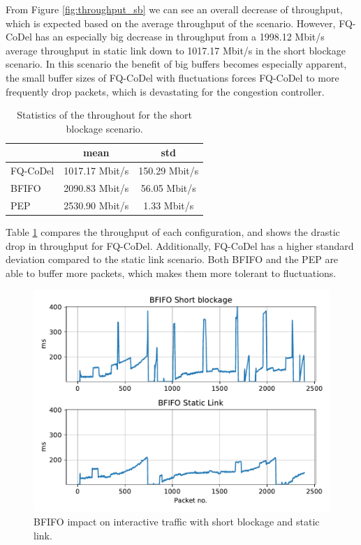 \documentclass[a4paper,english, 11pt]{report}
\begin{document}
From Figure \ref{fig:throughput_sb} we can see an overall decrease of throughput, which is expected based on the average throughput of the scenario. However, FQ-CoDel has an especially big decrease in throughput from a 1998.12 Mbit/s average throughput in static link down to 1017.17 Mbit/s in the short blockage scenario. In this scenario the benefit of big buffers becomes especially apparent, the small buffer sizes of FQ-CoDel with fluctuations forces FQ-CoDel to more frequently drop packets, which is devastating for the congestion controller.\\

\begin{table}[h!]
\centering
\begin{tabular}{l|c|c}
\hline
 & \textbf{mean} & \textbf{std}  \\ 
\hline
FQ-CoDel & 1017.17 Mbit/s & 150.29 Mbit/s \\
BFIFO    & 2090.83 Mbit/s & 56.05 Mbit/s \\
PEP      & 2530.90 Mbit/s & 1.33 Mbit/s \\
\hline
\end{tabular}
\caption{Statistics of the throughout for the short blockage scenario.}
\label{tab:throughput_sb_table}
\end{table}

Table \ref{tab:throughput_sb_table} compares the throughput of each configuration, and shows the drastic drop in throughput for FQ-CoDel. Additionally, FQ-CoDel has a higher standard deviation compared to the static link scenario. Both BFIFO and the PEP are able to buffer more packets, which makes them more tolerant to fluctuations.\\

\begin{figure}[!h!] %
	\centering
	\includegraphics[scale=0.70]{../diagrams/witestlab/throughput/throughput_bfifo_sb_sl.pdf}
  	\caption{BFIFO impact on interactive traffic with short blockage and static link.}
  	\label{fig:throughput_bfifo_sb_sl}
\end{figure}
\end{document}
